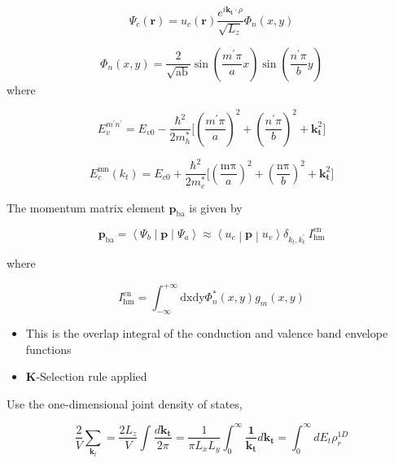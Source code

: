 \begin{equation}
\Psi_{c}\left( \bm{r} \right) = u_{c}(\bm{r})\frac{e^{i\bm{k}_{\bm{t}} \cdot \rho}}{\sqrt{L_{z}}}\Phi_{n}(x,y)
\end{equation}

\begin{equation}
\Phi_{n}(x,y) = \frac{2}{\sqrt{\text{ab}}}\sin{(\frac{m^{'}\pi}{a}x)\sin{(\frac{n^{'}\pi}{b}y)}}
\end{equation}
where

\begin{equation}
E_{v}^{m^{'}n^{'}} = E_{v0} - \frac{\hbar^{2}}{2m_{h}^{*}}\lbrack\left( \frac{m^{'}\pi}{a} \right)^{2} + \left( \frac{n^{'}\pi}{b} \right)^{2} + \bm{k}_{\bm{t}}^{2}\rbrack
\end{equation}

\begin{equation}
E_{c}^{\text{mn}}\left( k_{t} \right) = E_{c0} + \frac{\hbar^{2}}{2m_{e}^{*}}\lbrack\left( \frac{\text{mπ}}{a} \right)^{2} + \left( \frac{\text{nπ}}{b} \right)^{2} + \bm{k}_{\bm{t}}^{2}\rbrack
\end{equation}

The momentum matrix element \(\bm{p}_{\text{ba}}\) is given by

\begin{equation}
\bm{p}_{\text{ba}}\bm{=}\left\langle \Psi_{b} \middle| \bm{p} \middle| \Psi_{a} \right\rangle \approx \left\langle u_{c} \middle| \bm{p} \middle| u_{v} \right\rangle\delta_{k_{t},k_{t}^{'}}\ I_{\text{hm}}^{\text{en}}
\end{equation}

where

\begin{equation}
I_{\text{hm}}^{\text{en}} = \int_{- \infty}^{+ \infty}{\text{dxdy}\Phi_{n}^{*}(x,y)}g_{m}(x,y)
\end{equation}

\begin{itemize}
\item
  This is the overlap integral of the conduction and valence band
  envelope functions
\item
  \textbf{K}-Selection rule applied
\end{itemize}

Use the one-dimensional joint density of states,

\begin{equation}
\frac{2}{V}\sum_{\bm{k}_{t}}^{}{= \frac{2L_{z}}{V}}\int_{}^{}\frac{d\bm{k}_{\bm{t}}}{2\pi} = \frac{1}{\pi L_{x}L_{y}}\int_{0}^{\infty}\frac{\bm{1}}{\bm{k}_{\bm{t}}}d\bm{k}_{\bm{t}}\bm{=}\int_{0}^{\infty}{dE_{t}}\rho_{r}^{1D}
\end{equation}

